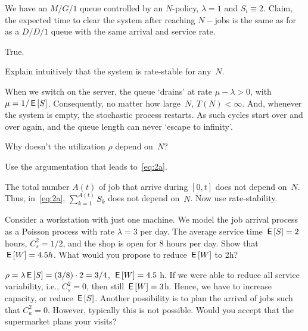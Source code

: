 \documentclass[stochastic-or.tex]{subfiles}
\begin{document}
\begin{truefalse}[5.6]
We have an $M/G/1$ queue controlled by an $N$-policy, $\lambda=1$ and $S_i\equiv 2$.
Claim, the expected time to clear the system after reaching $N-$jobs is the same as for as a $D/D/1$ queue with the same arrival and service rate.
    \begin{solution}
        True.
    \end{solution}
\end{truefalse}


\begin{exercise}
Explain intuitively that the system is rate-stable for any~$N$.
\begin{solution}
  When we switch on the server, the queue `drains' at rate $\mu-\lambda>0$, with $\mu=1/\,\mathsf{E}\left[S\right]$.
  Consequently, no matter how large~$N$, $T(N)<\infty$.
  And, whenever the system is empty, the stochastic process restarts.
  As such cycles start over and over again, and the queue length can never `escape to infinity'.
\end{solution}
\end{exercise}


\begin{exercise}
  Why doesn't  the utilization $\rho$ depend on~$N$?
\begin{hint}
 Use the argumentation that leads to~\cref{eq:2a}.
\end{hint}
\begin{solution}
  The total number $A(t)$ of job that arrive during $[0,t]$ does not depend on~$N$.
  Thus, in~\cref{eq:2a}, $\sum_{k=1}^{A(t)}S_k$ does not depend on~$N$.
  Now use rate-stability.
\end{solution}
\end{exercise}


\begin{exercise}\label{ex:l-241}
 Consider a workstation with just one machine.
 We model the job arrival process as a Poisson process with rate $\lambda=3$ per day.
 The average service time $\,\mathsf{E}\left[S\right] = 2$ hours, $C^2_s = 1/2$, and the shop is open for 8 hours per day.
Show that  $\,\mathsf{E}\left[W\right] = 4.5h$. What would you propose to reduce $\,\mathsf{E}\left[W\right]$ to 2h?
\begin{solution}
$\rho = \lambda \,\mathsf{E}\left[S\right] = (3/8)\cdot 2 = 3/4$, $\,\mathsf{E}\left[W\right] = 4.5$ h.
If we were able to reduce all service variability, i.e., $C_s^2=0$, then still $\,\mathsf{E}\left[W\right] = 3$h.
Hence, we have to increase capacity, or reduce $\,\mathsf{E}\left[S\right]$.
Another possibility is to plan the arrival of jobs such that $C_a^2=0$.
However, typically this is not possible.
Would you accept that the supermarket plans your visits?
\end{solution}
\end{exercise}
\end{document}
